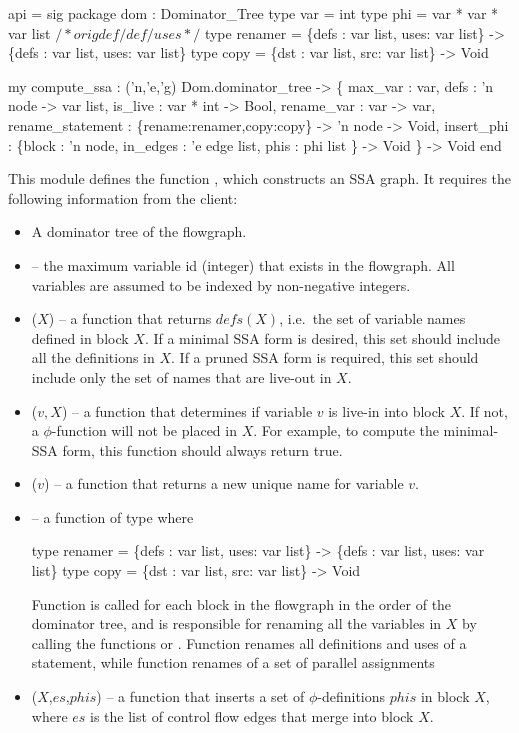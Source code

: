 \begin{SML}
 api  = sig
   package dom : Dominator_Tree
   type var     = int 
   type phi  = var * var * var list $/* orig def/def/uses */$
   type renamer = \{defs : var list, uses: var list\} ->
                  \{defs : var list, uses: var list\}
   type copy    = \{dst : var list, src: var list\} -> Void

   my compute_ssa : 
       ('n,'e,'g) Dom.dominator_tree ->
       \{ max_var      : var,  
         defs         : 'n node -> var list,
         is_live      : var * int -> Bool,
         rename_var   : var -> var,
         rename_statement  : \{rename:renamer,copy:copy\} -> 'n node -> Void,
         insert_phi   : \{block    : 'n node,
                         in_edges : 'e edge list,
                         phis     : phi list 
                        \} -> Void
       \} -> Void
 end
\end{SML}

This module defines the function , which
constructs an SSA graph.  It requires 
the following information from the client:
\begin{itemize}
\item A dominator tree of the flowgraph.
\item {} -- the maximum variable id (integer) that exists
in the flowgraph.  All variables are assumed to be indexed by non-negative
 integers.
\item {}($X$) -- a function that returns $defs(X)$, 
i.e.~the set of variable names defined in block $X$.
If a minimal SSA form is desired, this set should include all the definitions
in $X$.  If a pruned SSA form is required, this set should
include only the set of names that are live-out in $X$.
\item {}($v,X$) -- a function that determines if
variable $v$ is live-in into block $X$.  If not, a $\phi$-function will
not be placed in $X$.  For example, to compute
the minimal-SSA form, this function should always return true. 
\item {}($v$) -- a function that returns a new 
unique name for variable $v$.   
\item {} -- a function of type
        where
\begin{SML}
   type renamer = \{defs : var list, uses: var list\} ->
                  \{defs : var list, uses: var list\}
   type copy    = \{dst : var list, src: var list\} -> Void
\end{SML}
Function  is called for each block
in the flowgraph in the order of the dominator tree, and
is responsible for renaming all the variables in $X$ by
calling the functions  or .
Function  renames all definitions and uses of
a statement, while function  renames
of a set of parallel assignments
\item {}($X$,$es$,$phis$) --
   a function that inserts a set of 
   $\phi$-definitions $phis$ in block $X$, where $es$
   is the list of control flow edges that merge into block $X$.
\end{itemize}      

